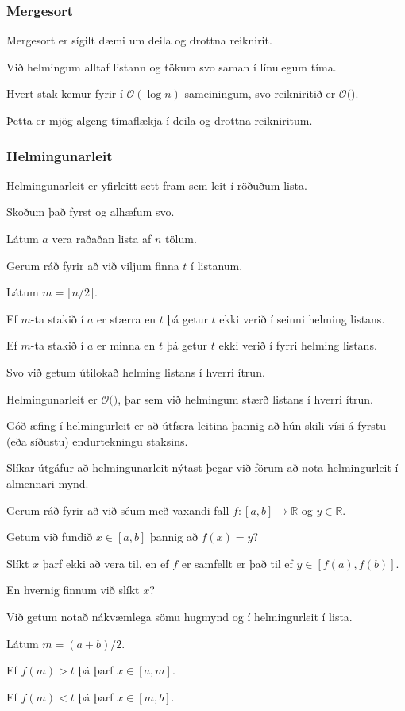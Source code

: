 {
}

{
	\frametitle{Mergesort}
	{
		\item<1-> Mergesort er sígilt dæmi um deila og drottna reiknirit.
		\item<2-> Við helmingum alltaf listann og tökum svo saman í línulegum tíma.
		\item<3-> Hvert stak kemur fyrir í $\mathcal{O}(\log n)$ sameiningum, svo reikniritið er $\mathcal{O}($\onslide<4->{$n \log n$}$)$.
		\item<5-> Þetta er mjög algeng tímaflækja í deila og drottna reikniritum.
	}
}

{
	\frametitle{Helmingunarleit}
	{
		\item<1-> Helmingunarleit er yfirleitt sett fram sem leit í röðuðum lista.
		\item<2-> Skoðum það fyrst og alhæfum svo.
		\item<3-> Látum $a$ vera raðaðan lista af $n$ tölum.
		\item<4-> Gerum ráð fyrir að við viljum finna $t$ í listanum.
		\item<5-> Látum $m = \lfloor n/2 \rfloor$.
		\item<6-> Ef $m$-ta stakið í $a$ er stærra en $t$ þá getur $t$ ekki verið í seinni helming listans.
		\item<7-> Ef $m$-ta stakið í $a$ er minna en $t$ þá getur $t$ ekki verið í fyrri helming listans.
		\item<8-> Svo við getum útilokað helming listans í hverri ítrun.
	}
}

{
}

{
	{
		\item<1-> Helmingunarleit er $\mathcal{O}($$)$, þar sem við helmingum stærð listans í hverri ítrun.
		\item<3-> Góð æfing í helmingurleit er að útfæra leitina þannig að hún skili vísi á fyrstu (eða síðustu)  endurtekningu staksins.
		\item<4-> Slíkar útgáfur að helmingunarleit nýtast þegar við förum að nota helmingurleit í almennari mynd.
	}
}

{
	{
		\item<1-> Gerum ráð fyrir að við séum með vaxandi fall $f \colon [a, b] \rightarrow \mathbb{R}$ og $y \in \mathbb{R}$.
		\item<2-> Getum við fundið $x \in [a, b]$ þannig að $f(x) = y$?
		\item<3-> Slíkt $x$ þarf ekki að vera til, en ef $f$ er samfellt er það til ef $y \in [f(a), f(b)]$.
		\item<4-> En hvernig finnum við slíkt $x$?
		\item<5-> Við getum notað nákvæmlega sömu hugmynd og í helmingurleit í lista.
		\item<6-> Látum $m = (a + b)/2$.
		\item<7-> Ef $f(m) > t$ þá þarf $x \in [a, m]$.
		\item<8-> Ef $f(m) < t$ þá þarf $x \in [m, b]$.
	}
}

